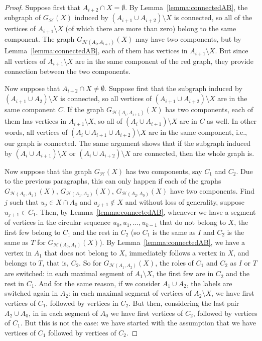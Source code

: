 \documentclass[11pt,a4paper]{article}
\begin{document}
\begin{proof}
 Suppose first that $A_{i+2}\cap X=\emptyset$. %
 By Lemma~\ref{lemma:connectedAB}, the subgraph of $G_{\mathcal{H}}(X)$ induced by $(A_{i+1}\cup A_{i+2})\setminus X$ is connected, so all of the vertices of $A_{i+1}\setminus X$ (of which there are more than zero) belong to the same component.
 The graph $G_{\mathcal{H}(A_i,A_{i+1})}(X)$ may have two components, but by Lemma~\ref{lemma:connectedAB}, each of them has vertices in $A_{i+1}\setminus X$. But since all vertices of $A_{i+1}\setminus X$ are in the same component of %
 the red graph, they provide connection between the two components.

 Now suppose that $A_{i+2}\cap X\neq \emptyset$. Suppose first that the subgraph induced by $(A_{i+1}\cup A_2)\setminus X$ is connected, so all vertices of $(A_{i+1}\cup A_{i+2})\setminus X$ are in the same component $C$. If the graph $G_{\mathcal{H}(A_i,A_{i+1})}(X)$ has two components, each of them has vertices in $A_{i+1}\setminus X$, so all of $(A_i\cup A_{i+1})\setminus X$ are in $C$ as well. In other words, all vertices of $(A_i\cup A_{i+1}\cup A_{i+2})\setminus X$ are in the same component, i.e., our graph is connected. The same argument shows that if the subgraph induced by $(A_i\cup A_{i+1})\setminus X$ or $(A_i\cup A_{i+2})\setminus X$  are connected, then the whole graph is.

 Now suppose that the graph $G_{\mathcal{H}}(X)$ has two components, say $C_1$ and $C_2$. Due to the previous paragraphs, this can only happen if each of the
 graphs $G_{\mathcal{H}(A_0,A_1)}(X)$, $G_{\mathcal{H}(A_1,A_2)}(X)$, $G_{\mathcal{H}(A_2,A_0)}(X)$ have two components.
 Find $j$ such that $u_j\in X\cap A_0$ and $u_{j+1}\not \in X$ and without loss of generality, suppose $u_{j+1}\in C_1$. Then, by Lemma~\ref{lemma:connectedAB}, whenever we have a segment of vertices in the circular sequence $u_0,u_1,\dots,u_{k-1}$ that do not belong to $X$, the first few belong to $C_1$ and the rest in $C_2$ (so $C_1$ is the same as $I$ and $C_2$ is the same as $T$ for $G_{\mathcal{H}(A_0,A_1)}(X)$). By Lemma~\ref{lemma:connectedAB}, we have a vertex in $A_1$ that does not belong to $X$, immediately follows a vertex in $X$, and belongs to $T$, that is, $C_2$. So for $G_{\mathcal{H}(A_1,A_2)}(X)$, the roles of $C_1$ and $C_2$ as $I$ or $T$ are switched: in each maximal segment of $A_1\setminus X$, the first few are in $C_2$ and the rest in $C_1$. And for the same reason, if we consider $A_1\cup A_2$, the labels are switched again in $A_2$: in each maximal segment of vertices of $A_2\setminus X$, we have first vertices of $C_1$, followed by vertices in $C_2$. But then, considering the last pair $A_2\cup A_0$, in in each segment of $A_0$ we have first vertices of $C_2$, followed by vertices of $C_1$. But this is not the case: we have started with the assumption that we have vertices of $C_1$ followed by vertices of $C_2$.
 \end{proof}
\end{document}
